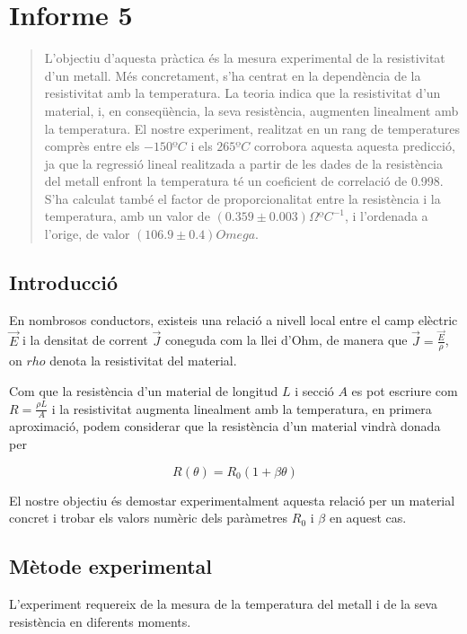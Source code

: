 
\chapter{Informe 5}
\begin{abstract}
	L'objectiu d'aquesta pràctica és la mesura experimental de la resistivitat d'un metall. Més concretament, s'ha centrat en la dependència de la resistivitat amb la temperatura. La teoria indica que la resistivitat d'un material, i, en conseqüència, la seva resistència, augmenten linealment amb la temperatura. El nostre experiment, realitzat en un rang de temperatures comprès entre els $-150\si{ºC}$ i els $265\si{ºC}$ corrobora aquesta aquesta predicció, ja que la regressió lineal realitzada a partir de les dades de la resistència del metall enfront la temperatura té un coeficient de correlació de 0.998. S'ha calculat també el factor de proporcionalitat entre la resistència i la temperatura, amb un valor de $(0.359\pm0.003)\si{\Omega ºC^{-1}}$, i l'ordenada a l'orige, de valor $(106.9\pm0.4)\si{Omega}$.
\end{abstract}

\section{Introducció}
En nombrosos conductors, existeis una relació a nivell local entre el camp elèctric $\vec{E}$ i la densitat de corrent $\vec{J}$ coneguda com la llei d'Ohm, de manera que $\vec{J}=\frac{\vec{E}}{\rho}$, on $rho$ denota la resistivitat del material.

Com que la resistència d'un material de longitud $L$ i secció $A$ es pot escriure com $R=\frac{\rho L}{A}$ i la resistivitat augmenta linealment amb la temperatura, en primera aproximació, podem considerar que la resistència d'un material vindrà donada per 

\begin{equation} \label{eq: <regressio>}
R(\theta)=R_0(1+\beta\theta)
\end{equation}

El nostre objectiu és demostar experimentalment aquesta relació per un material concret i trobar els valors numèric dels paràmetres $R_0$ i $\beta$ en aquest cas.

\section{Mètode experimental}

L'experiment requereix de la mesura de la temperatura del metall i de la seva resistència en diferents moments.

